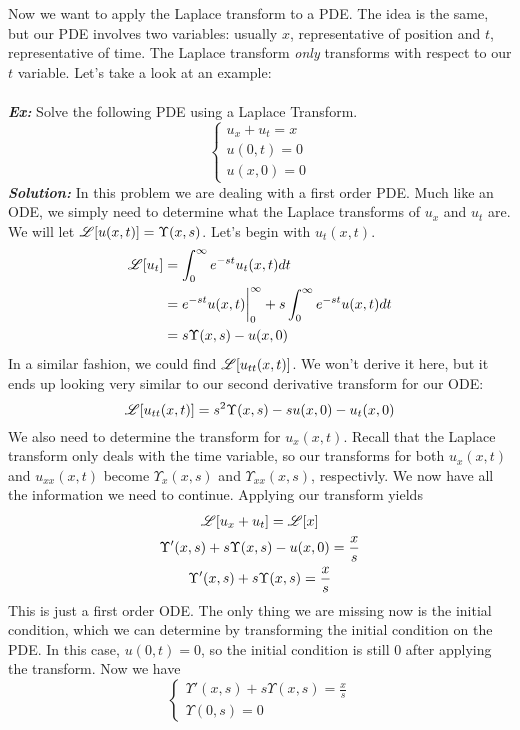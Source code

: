 \indent Now we want to apply the Laplace transform to a PDE. The idea is the same, but our PDE involves
two variables: usually $x$, representative of position and $t$, representative of time. The Laplace
transform \textit{only} transforms with respect to our $t$ variable. Let's take a look at an
example:\\\\
\noindent \textbf{\textit{Ex:}} Solve the following PDE using a Laplace Transform.
\[
\begin{cases*}
u_{x} + u_{t} = x\\
u(0,t) = 0\\
u(x,0) = 0
\end{cases*}
\]
\indent \textbf{\textit{Solution:}} In this problem we are dealing with a first order PDE. Much
like an ODE, we simply need to determine what the Laplace transforms of $u_{x}$ and $u_{t}$ are.
We will let $\mathscr{L}[u(x,t)] = \Upsilon(x,s)$. Let's begin with $u_{t}(x,t)$.
\begin{align*}
\mathscr{L}[u_{t}] &= \int_{0}^{\infty}e^{-st}u_{t}(x,t)dt\\
&= e^{-st}u(x,t)\bigg|_{0}^{\infty} + s\int_{0}^{\infty}e^{-st}u(x,t)dt\\
&= s\Upsilon(x,s)-u(x,0)
\end{align*}
In a similar fashion, we could find $\mathscr{L}[u_{tt}(x,t)]$. We won't derive it here, but it ends up
looking very similar to our second derivative transform for our ODE:
\[
\mathscr{L}[u_{tt}(x,t)] = s^{2}\Upsilon(x,s)-su(x,0)-u_{t}(x,0)
\]
We also need to determine the transform for $u_{x}(x,t)$. Recall that the Laplace transform only
deals with the time variable, so our transforms for both $u_{x}(x,t)$ and $u_{xx}(x,t)$ become
$\Upsilon_{x}(x,s)$ and $\Upsilon_{xx}(x,s)$, respectivly. We now have all the information we need
to continue. Applying our transform yields
\begin{gather*}
\mathscr{L}[u_{x} + u_{t}] = \mathscr{L}[x]\\
\Upsilon'(x,s) + s\Upsilon(x,s)-u(x,0) = \frac{x}{s}\\
\Upsilon'(x,s) + s\Upsilon(x,s) =\frac{x}{s}
\end{gather*}
This is just a first order ODE. The only thing we are missing now is the initial condition, which
we can determine by transforming the initial condition on the PDE. In this case, $u(0,t) = 0$, so
the initial condition is still 0 after applying the transform. Now we have
\[
\begin{cases*}
\Upsilon'(x,s) + s\Upsilon(x,s) =\frac{x}{s}\\
\Upsilon(0,s) = 0
\end{cases*}
\]
